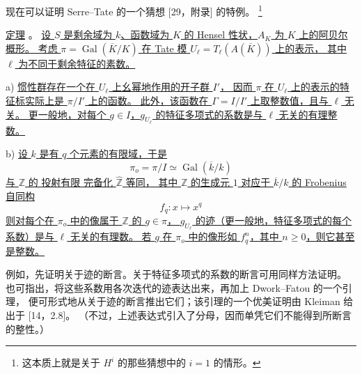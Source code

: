 现在可以证明 Serre--Tate 的一个猜想 [29，附录] 的特例。
\footnote{这本质上就是关于 $H^i$ 的那些猜想中的 $i=1$ 的情形。}



\medskip
\noindent
\underline{定理} 。
\underline{设 $S$ 是剩余域为 $k$、函数域为 $K$ 的 Hensel 性状，$A_K$ 为 $K$ 上的阿贝尔概形。
考虑 $\pi=\operatorname{Gal}(\overline K/K)$ 在 Tate 模 $U_\ell=T_\ell(A(\overline K))$ 上的表示，
其中 $\ell$ 为不同于剩余特征的素数。}

\smallskip
\noindent
a) \underline{惯性群存在一个在 $U_\ell$ 上幺幂地作用的开子群 $I'$，
因而 $\pi$ 在 $U_\ell$ 上的表示的特征标实际上是 $\pi/I'$ 上的函数。
此外，该函数在 $\Gamma=I/I'$ 上取整数值，且与 $\ell$ 无关。
更一般地，对每个 $g\in I$，$g_{U_\ell}$ 的特征多项式的系数是与 $\ell$ 无关的有理整数。}

\smallskip
\noindent
b) \underline{设 $k$ 是有 $q$ 个元素的有限域，于是}
\[
 \pi_o=\pi/I\simeq\operatorname{Gal}(\overline k/k)
\]
\underline{与 $\mathbb Z$ 的 投射有限 完备化 $\widehat{\mathbb Z}$ 等同，
其中 $\mathbb Z$ 的生成元 $1$ 对应于 $\overline k/k$ 的 Frobenius 自同构}
\[
 f_q:x\longmapsto x^q
\]
\underline{则对每个在 $\pi_o$ 中的像属于 $\mathbb Z$ 的 $g\in\pi$，
$g_{U_\ell}$ 的迹（更一般地，特征多项式的每个系数）是与 $\ell$ 无关的有理数。
若 $g$ 在 $\pi_o$ 中的像形如 $f_q^{n}$，其中 $n\geq0$，则它甚至是整数。}

例如，先证明关于迹的断言。关于特征多项式的系数的断言可用同样方法证明。
也可指出，将这些系数用各次迭代的迹表达出来，再加上 Dwork--Fatou 的一个引理，
便可形式地从关于迹的断言推出它们；该引理的一个优美证明由 Kleiman 给出于 [14，2.8]。
（不过，上述表达式引入了分母，因而单凭它们不能得到所断言的整性。）

